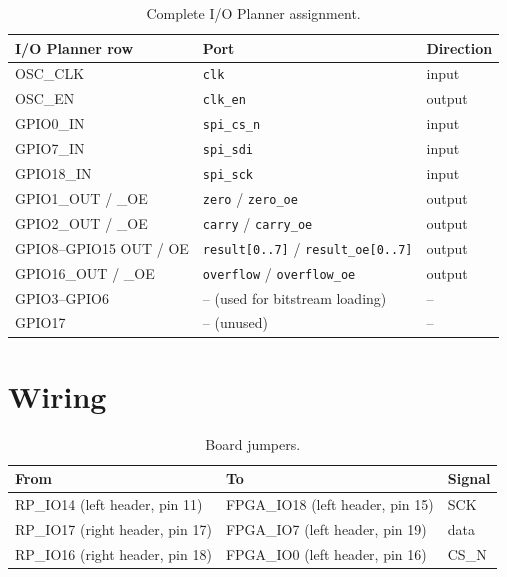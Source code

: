 \documentclass[12pt,a4paper,twoside]{article}
\begin{document}
\begin{table}[H]
\centering
\caption{Complete I/O Planner assignment.}
\label{tab:ioplanner-full}
\begin{tabular}{@{}lll@{}}
\toprule
\textbf{I/O Planner row} & \textbf{Port} & \textbf{Direction} \\
\midrule
OSC\_CLK          & \texttt{clk}            & input \\
OSC\_EN           & \texttt{clk\_en}        & output \\
GPIO0\_IN         & \texttt{spi\_cs\_n}     & input \\
GPIO7\_IN         & \texttt{spi\_sdi}       & input \\
GPIO18\_IN        & \texttt{spi\_sck}       & input \\
GPIO1\_OUT / \_OE & \texttt{zero} / \texttt{zero\_oe}   & output \\
GPIO2\_OUT / \_OE & \texttt{carry} / \texttt{carry\_oe} & output \\
GPIO8--GPIO15 OUT / OE & \texttt{result[0..7]} / \texttt{result\_oe[0..7]} & output \\
GPIO16\_OUT / \_OE & \texttt{overflow} / \texttt{overflow\_oe} & output \\
GPIO3--GPIO6       & -- (used for bitstream loading) & -- \\
GPIO17             & -- (unused)                     & -- \\
\bottomrule
\end{tabular}
\end{table}

\section{Wiring}
\label{app:wiring}

\begin{table}[H]
\centering
\caption{Board jumpers.}
\label{tab:jumpers}
\begin{tabular}{@{}lll@{}}
\toprule
\textbf{From} & \textbf{To} & \textbf{Signal} \\
\midrule
RP\_IO14 (left header, pin 11)  & FPGA\_IO18 (left header, pin 15) & SCK \\
RP\_IO17 (right header, pin 17) & FPGA\_IO7 (left header, pin 19)  & data \\
RP\_IO16 (right header, pin 18) & FPGA\_IO0 (left header, pin 16)  & CS\_N \\
\bottomrule
\end{tabular}
\end{table}
\end{document}

